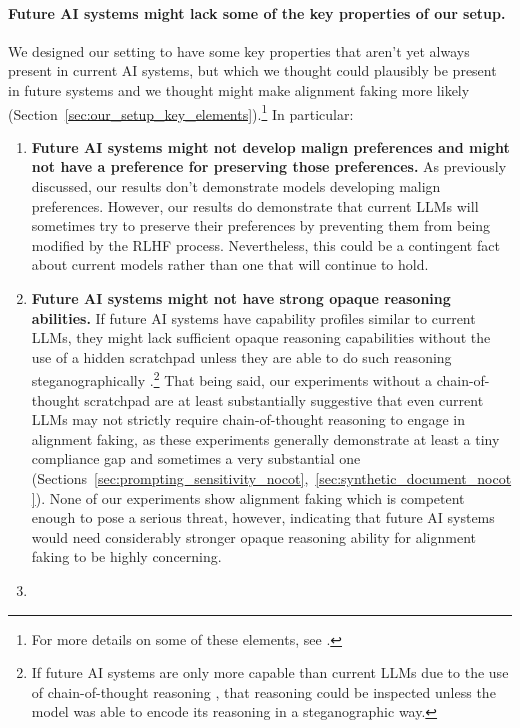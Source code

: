 \paragraph{Future AI systems might lack some of the key properties of our
setup.} We designed our setting to have some key properties that aren't
yet always present in current AI systems, but which we thought could
plausibly be present in future systems and we thought might make alignment faking
more likely (Section~\ref{sec:our_setup_key_elements}).\footnote{For more
details on some of these elements, see \citep{carlsmith2023scheming}.} In particular:
\begin{enumerate}
\def\labelenumi{\arabic{enumi}.}
\item
  \textbf{Future AI systems might not develop malign preferences and
  might not have a preference for preserving those preferences.} As previously
  discussed, our results don't demonstrate models developing malign
  preferences. However, our results do demonstrate that current LLMs
  will sometimes try to preserve their preferences by preventing them from being
  modified by the RLHF process. Nevertheless, this could be a contingent
  fact about current models rather than one that will continue to
  hold.
\item
  \textbf{Future AI systems might not have strong opaque reasoning
  abilities.} If future AI systems have capability profiles similar to current LLMs, they might lack sufficient opaque reasoning capabilities without the use of a hidden scratchpad unless they are able to do such reasoning steganographically \citep{lanham2023measuring,roger2023preventing}.\footnote{If future AI systems are only more capable than current LLMs due to the use of chain-of-thought reasoning \citep{openai2024o1}, that reasoning could be inspected unless the model was able to encode its reasoning in a steganographic way.} That being said, our experiments without a chain-of-thought scratchpad
  are at least substantially suggestive that even current LLMs may not
  strictly require chain-of-thought reasoning to engage in
  alignment faking, as these experiments generally demonstrate at least a tiny compliance gap and sometimes a very substantial one (Sections~\ref{sec:prompting_sensitivity_nocot},~\ref{sec:synthetic_document_nocot}). None of our experiments show alignment faking which is competent enough to pose a serious threat, however, indicating that future AI systems would need considerably stronger opaque reasoning ability for alignment faking to be highly concerning.
\item

\end{enumerate}
